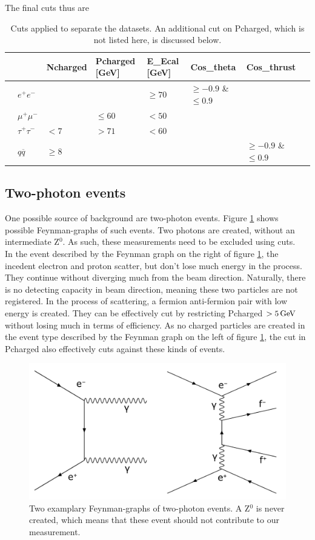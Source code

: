 The final cuts thus are
\begin{table}[H]\centering
	\begin{tabular}{@{}llllllll@{}}
		\toprule
		&			&Ncharged	&Pcharged [GeV]	&E\_Ecal [GeV] &Cos\_theta				&Cos\_thrust\\ 
		\midrule
		&$e^+e^-$	&			&				&$\ge70$		&$\ge-0.9$ \& $\le0.9$	&\\
		&$\mu^+\mu^-$		&			&$\le60$		&$<50$			&						&\\
		&$\tau^+\tau^-$		&$<7$		&$>71$			&$<60$			&						&\\
		&$q\overline{q}$		&$\ge8$		&				&				&						&$\ge-0.9$ \& $\le0.9$	\\
		\bottomrule
	\end{tabular}
	\caption[Table of cuts]{Cuts applied to separate the datasets. An additional cut on Pcharged, which is not listed here, is discussed below.}
\end{table}

\subsection{Two-photon events}
One possible source of background are two-photon events. Figure \ref{fig:twophotonfeynman} shows possible Feynman-graphs of such events. Two photons are created, without an intermediate Z$^0$. As such, these measurements need to be excluded using cuts.\\
In the event described by the Feynman graph on the right of figure \ref{fig:twophotonfeynman}, the incedent electron and proton scatter, but don't lose much energy in the process. They continue without diverging much from the beam direction. Naturally, there is no detecting capacity in beam direction, meaning these two particles are not registered. In the process of scattering, a fermion anti-fermion pair with low energy is created. They can be effectively cut by restricting Pcharged $> \unit[5]{GeV}$ without losing much in terms of efficiency.
As no charged particles are created in the event type described by the Feynman graph on the left of figure \ref{fig:twophotonfeynman}, the cut in Pcharged also effectively cuts against these kinds of events.
\begin{figure}[H]
\centering
\includegraphics[width=1.0\linewidth]{graphics/twophotonfeynman_both.pdf}
\caption[Two-photon Feynman-graph]{Two examplary Feynman-graphs of two-photon events. A Z$^0$ is never created, which means that these event should not contribute to our measurement.}
\label{fig:twophotonfeynman}
\end{figure}

